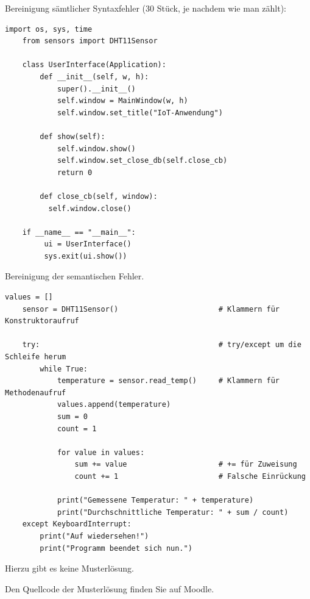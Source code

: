 \teilaufgabe
Bereinigung sämtlicher Syntaxfehler (30 Stück, je nachdem wie man zählt):

\begin{Verbatim}[gobble=4]
    import os, sys, time
    from sensors import DHT11Sensor

    class UserInterface(Application):
        def __init__(self, w, h):
            super().__init__()
            self.window = MainWindow(w, h)
            self.window.set_title("IoT-Anwendung")

        def show(self):
            self.window.show()
            self.window.set_close_db(self.close_cb)
            return 0

        def close_cb(self, window):
          self.window.close()

    if __name__ == "__main__":
         ui = UserInterface()
         sys.exit(ui.show())
\end{Verbatim}

\teilaufgabe
Bereinigung der semantischen Fehler.

\begin{Verbatim}[gobble=4]
    values = []
    sensor = DHT11Sensor()                       # Klammern für Konstruktoraufruf

    try:                                         # try/except um die Schleife herum
        while True:
            temperature = sensor.read_temp()     # Klammern für Methodenaufruf
            values.append(temperature)
            sum = 0
            count = 1

            for value in values:
                sum += value                     # += für Zuweisung
                count += 1                       # Falsche Einrückung

            print("Gemessene Temperatur: " + temperature)
            print("Durchschnittliche Temperatur: " + sum / count)
    except KeyboardInterrupt:
        print("Auf wiedersehen!")
        print("Programm beendet sich nun.")
\end{Verbatim}

Hierzu gibt es keine Musterlösung. \smiley

Den Quellcode der Musterlösung finden Sie auf Moodle.
